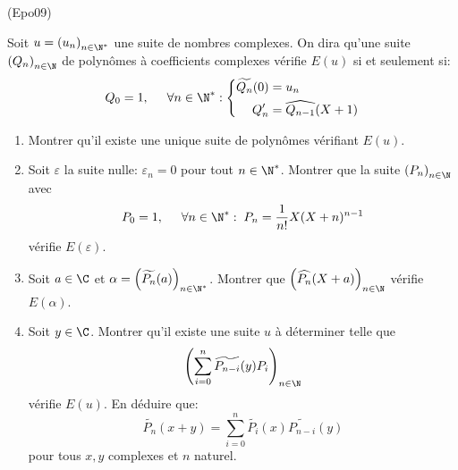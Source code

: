 \begin{tiny}(Epo09)\end{tiny} Soit $u= \left( u_n\right) _{n\in \N^*}$ une suite de nombres complexes. On dira qu'une suite $\left( Q_n\right) _{n\in \N}$ de polynômes à coefficients complexes vérifie $E(u)$ si et seulement si:
\begin{displaymath}
 Q_0 = 1, \hspace{0.5cm}\forall n\in \N^*:
\left\lbrace 
\begin{aligned}
 \widetilde{Q_n}(0) &= u_n \\
 Q'_n &= \widehat{Q_{n-1}}(X+1) 
\end{aligned}
\right. 
\end{displaymath}
\begin{enumerate}
 \item Montrer qu'il existe une unique suite de polynômes vérifiant $E(u)$.
 \item Soit $\varepsilon$ la suite nulle: $\varepsilon_n=0$ pour tout $n\in \N^*$. Montrer que la suite $\left( P_n\right) _{n\in \N}$ avec 
\begin{displaymath}
 P_0=1,\hspace{0.5cm}\forall n\in \N^*:\;
P_n = \frac{1}{n!}X(X+n)^{n-1}
\end{displaymath}
vérifie $E(\varepsilon)$.
\item Soit $a\in \C$ et $\alpha = \left( \widetilde{P_n}(a)\right) _{n\in \N^*}$.\newline
Montrer que $\left( \widehat{P_n}(X+a)\right) _{n\in \N}$ vérifie $E(\alpha)$.
\item Soit $y\in \C$. Montrer qu'il existe une suite $u$ à déterminer telle que
\begin{displaymath}
 \left( \sum_{i=0}^{n}\widetilde{P_{n-i}}(y)P_i\right) _{n\in \N}
\end{displaymath}
vérifie $E(u)$. En déduire que:
\begin{displaymath}
 \widetilde{P_{n}}(x+y) = \sum_{i=0}^{n}\widetilde{P_{i}}(x)\widetilde{P_{n-i}}(y)
\end{displaymath}
pour tous $x, y$ complexes et $n$ naturel.
\end{enumerate}
